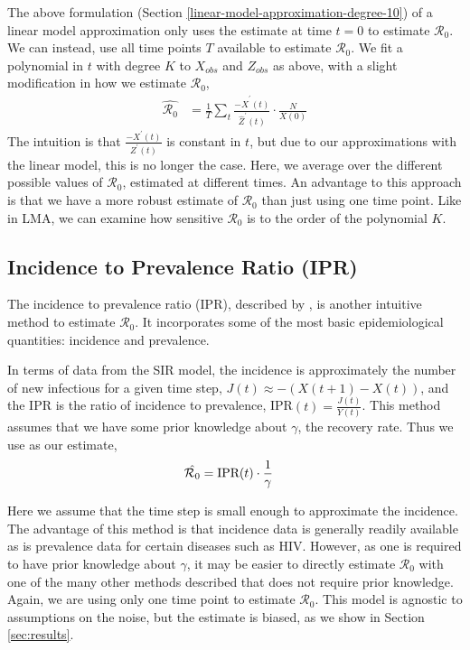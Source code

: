 \documentclass[12pt]{article}
\newcommand{\rr}{\ensuremath{\mathcal{R}_0}}
\begin{document}
The above formulation (Section \ref{linear-model-approximation-degree-10}) of a linear model approximation only uses the estimate at time $t=0$ to estimate $\rr$.  We can instead, use all time points $T$ available to estimate $\rr$.  We fit a polynomial in \(t\) with degree \(K\) to \(X_{obs}\)
and \(Z_{obs}\) as above, with a slight modification in how we estimate
\(\rr\),
\begin{align*}
  \hat{\rr} &= \frac{1}{T} \sum_t \frac{-\hat{X}^\prime(t)}{\hat{Z}^\prime(t)} \cdot \frac{N}{X(0)} 
\end{align*}
The intuition is that $\frac{-X^\prime(t)}{Z^\prime(t)}$ is constant in $t$, but due to our approximations with the linear model, this is no longer the case.  Here, we average over the different possible values of $\rr$, estimated at different times.  An advantage to this approach is that we have a more robust estimate of $\rr$ than just using one time point.  Like in LMA, we can examine how sensitive $\rr$ is to the order of the polynomial $K$.


\subsection{Incidence to Prevalence Ratio (IPR)}\label{incidence-to-prevalence-ratio}
The incidence to prevalence ratio (IPR), described by \cite{Nishiura2009}, is another intuitive method to estimate $\rr$.  It incorporates some of the most basic epidemiological quantities: incidence and prevalence.

In terms of data from the SIR model, the incidence is approximately the number of new infectious for a given time step, $J(t) \approx -(X(t+1) - X(t))$, and the IPR is the ratio of incidence to prevalence, IPR$(t) = \frac{J(t)}{Y(t)}$.  This method assumes that we have some prior knowledge about $\gamma$, the recovery rate.  Thus we use as our estimate,
\begin{align*}
\hat{\rr} &= \textnormal{IPR}(t) \cdot \frac{1}{\gamma}
\end{align*}

Here we assume that the time step is small enough to approximate the incidence.  The advantage of this method is that incidence data is generally readily available as is prevalence data for certain diseases such as HIV.  However, as one is required to have prior knowledge about $\gamma$, it may be easier to directly estimate $\rr$ with one of the many other methods described that does not require  prior knowledge.  Again, we are using only one time point to estimate $\rr$.  This model is agnostic to assumptions on the noise, but the estimate is biased, as we show in Section \ref{sec:results}.
\end{document}
